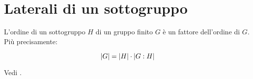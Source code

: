 \chapter{Laterali di un sottogruppo}

\begin{teorema}
	\label{thr:Laterali_Lagrange}
	L'ordine di un sottogruppo $H$ di un gruppo finito $G$ è un fattore dell'ordine di $G$. Più precisamente:
	
	\begin{equation}
		\lvert G \rvert = \lvert H \rvert \cdot \lvert G:H \rvert
	\end{equation}
\end{teorema}
\begin{dimostrazione}
	Vedi \cite[pag. 52]{jacobson}.
\end{dimostrazione}